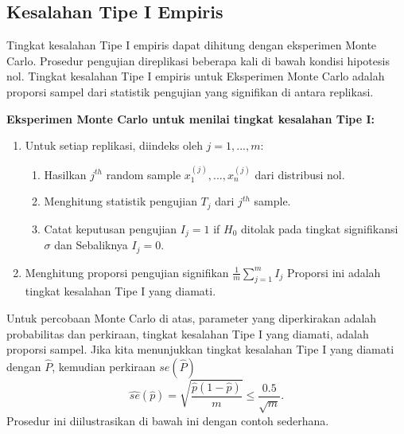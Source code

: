 \documentclass[a4paper,12pt]{article}
\theoremstyle{definition}
\begin{document}
\subsection{Kesalahan Tipe I Empiris}
Tingkat kesalahan Tipe I empiris dapat dihitung dengan eksperimen Monte Carlo. Prosedur pengujian direplikasi beberapa kali di bawah kondisi hipotesis nol. Tingkat kesalahan Tipe I empiris untuk Eksperimen Monte Carlo adalah proporsi sampel dari statistik pengujian yang signifikan di antara replikasi.

\textbf{Eksperimen Monte Carlo untuk menilai tingkat kesalahan Tipe I:}
\begin{enumerate}
    \item Untuk setiap replikasi, diindeks oleh $j = 1,...,m:$
    \begin{enumerate}
    \item  Hasilkan $j^{th}$ random sample $x_{1}^{(j)},...,x_{n}^{(j)}$ dari distribusi nol.
    \item Menghitung statistik pengujian $T_{j}$ dari $j^{th}$ sample.
    \item Catat keputusan pengujian $I_{j}=1$ if $H_{0}$ ditolak pada tingkat signifikansi $\sigma$ dan  Sebaliknya $I_{j} = 0$.
    \end{enumerate}
     \item Menghitung proporsi pengujian signifikan $\frac{1}{m}\sum_{j=1}^{m}I_{j}$ Proporsi ini adalah tingkat kesalahan Tipe I yang diamati.
\end{enumerate}
Untuk percobaan Monte Carlo di atas, parameter yang diperkirakan adalah probabilitas dan perkiraan, tingkat kesalahan Tipe I yang diamati, adalah proporsi sampel. Jika kita menunjukkan tingkat kesalahan Tipe I yang diamati dengan $\hat{P}$, kemudian perkiraan $se(\hat{P})$
\begin{equation}
    \hat{se}\left ( \hat{p} \right ) = \sqrt{\frac{\hat{p}(1-\hat{p})}{m}} \leq \frac{0.5}{\sqrt{m}}.
\end{equation}
Prosedur ini diilustrasikan di bawah ini dengan contoh sederhana.
\end{document}
